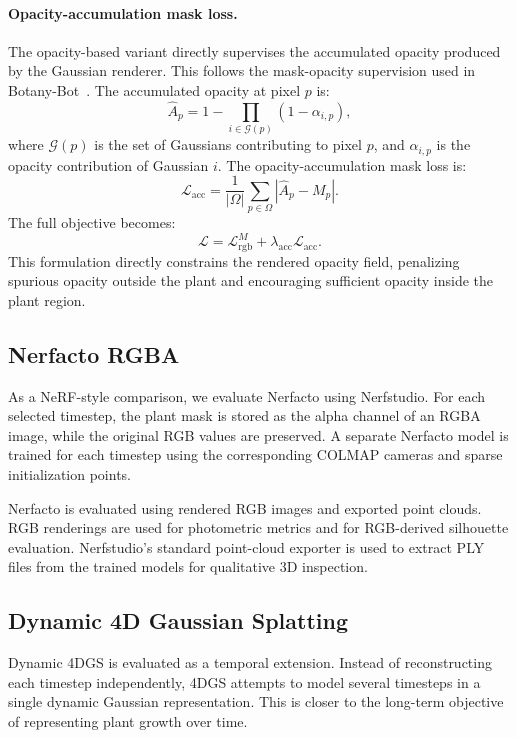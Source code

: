 \documentclass[sigconf]{acmart}
\begin{document}
\paragraph{Opacity-accumulation mask loss.}
The opacity-based variant directly supervises the accumulated opacity produced by the Gaussian renderer. This follows the mask-opacity supervision used in Botany-Bot~\cite{adebola2025botanybot}. The accumulated opacity at pixel $p$ is:
\begin{equation}
\hat{A}_p
=
1 -
\prod_{i \in \mathcal{G}(p)}
(1-\alpha_{i,p}),
\end{equation}
where $\mathcal{G}(p)$ is the set of Gaussians contributing to pixel $p$, and $\alpha_{i,p}$ is the opacity contribution of Gaussian $i$. The opacity-accumulation mask loss is:
\begin{equation}
\mathcal{L}_{\text{acc}}
=
\frac{1}{|\Omega|}
\sum_{p \in \Omega}
\left|
\hat{A}_p - M_p
\right|.
\end{equation}
The full objective becomes:
\begin{equation}
\mathcal{L}
=
\mathcal{L}_{\text{rgb}}^{M}
+
\lambda_{\text{acc}}\mathcal{L}_{\text{acc}}.
\end{equation}
This formulation directly constrains the rendered opacity field, penalizing spurious opacity outside the plant and encouraging sufficient opacity inside the plant region.


\subsection{Nerfacto RGBA}
As a NeRF-style comparison, we evaluate Nerfacto using Nerfstudio\cite{nerfstudio}. For each selected timestep, the plant mask is stored as the alpha channel of an RGBA image, while the original RGB values are preserved. A separate Nerfacto model is trained for each timestep using the corresponding COLMAP cameras and sparse initialization points.

Nerfacto is evaluated using rendered RGB images and exported point clouds. RGB renderings are used for photometric metrics and for RGB-derived silhouette evaluation. Nerfstudio's standard point-cloud exporter is used to extract PLY files from the trained models for qualitative 3D inspection.

\subsection{Dynamic 4D Gaussian Splatting}
Dynamic 4DGS\cite{luiten2024dynamic3dgaussians} is evaluated as a temporal extension. Instead of reconstructing each timestep independently, 4DGS attempts to model several timesteps in a single dynamic Gaussian representation. This is closer to the long-term objective of representing plant growth over time.
\end{document}
